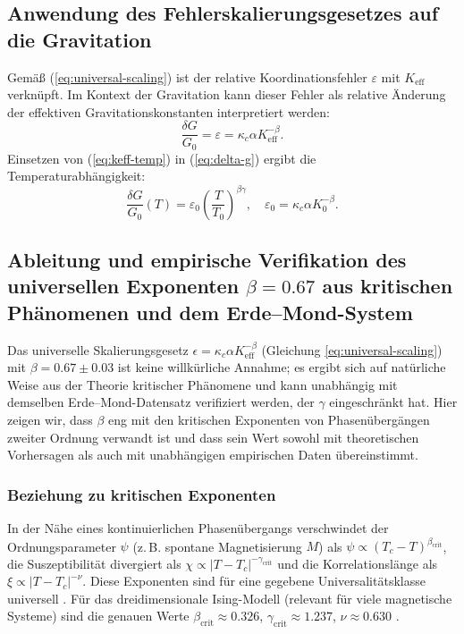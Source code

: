\documentclass[12pt]{article}
\theoremstyle{remark}
\newcommand{\Keff}{K_{\mathrm{eff}}}
\newcommand{\eps}{\varepsilon}
\newcommand{\kappac}{\kappa_c}
\begin{document}
	\subsection{Anwendung des Fehlerskalierungsgesetzes auf die Gravitation}
	\label{subsec:error-gravity}
	
	Gemäß (\ref{eq:universal-scaling}) ist der relative Koordinationsfehler $\eps$ mit $\Keff$ verknüpft. Im Kontext der Gravitation kann dieser Fehler als relative Änderung der effektiven Gravitationskonstanten interpretiert werden:
	\begin{equation}
		\frac{\delta G}{G_0} = \eps = \kappac \alpha \Keff^{-\beta}.
		\label{eq:delta-g}
	\end{equation}
	Einsetzen von (\ref{eq:keff-temp}) in (\ref{eq:delta-g}) ergibt die Temperaturabhängigkeit:
	\begin{equation}
		\frac{\delta G}{G_0}(T) = \eps_0 \left( \frac{T}{T_0} \right)^{\beta\gamma}, \quad \eps_0 = \kappac \alpha K_0^{-\beta}.
		\label{eq:g-temp}
	\end{equation}
	
	\subsection{Ableitung und empirische Verifikation des universellen Exponenten \(\beta = 0.67\) aus kritischen Phänomenen und dem Erde–Mond-System}
	\label{subsec:beta-empirical}
	
	Das universelle Skalierungsgesetz \(\epsilon = \kappa_c \alpha K_{\mathrm{eff}}^{-\beta}\) (Gleichung \ref{eq:universal-scaling}) mit \(\beta = 0.67 \pm 0.03\) ist keine willkürliche Annahme; es ergibt sich auf natürliche Weise aus der Theorie kritischer Phänomene und kann unabhängig mit demselben Erde–Mond-Datensatz verifiziert werden, der \(\gamma\) eingeschränkt hat. Hier zeigen wir, dass \(\beta\) eng mit den kritischen Exponenten von Phasenübergängen zweiter Ordnung verwandt ist und dass sein Wert sowohl mit theoretischen Vorhersagen als auch mit unabhängigen empirischen Daten übereinstimmt.
	
	\subsubsection{Beziehung zu kritischen Exponenten}
	In der Nähe eines kontinuierlichen Phasenübergangs verschwindet der Ordnungsparameter \(\psi\) (z. B. spontane Magnetisierung \(M\)) als \(\psi \propto (T_c - T)^{\beta_{\mathrm{crit}}}\), die Suszeptibilität divergiert als \(\chi \propto |T - T_c|^{-\gamma_{\mathrm{crit}}}\) und die Korrelationslänge als \(\xi \propto |T - T_c|^{-\nu}\). Diese Exponenten sind für eine gegebene Universalitätsklasse universell \cite{Wilson1974, Fisher1974}. Für das dreidimensionale Ising-Modell (relevant für viele magnetische Systeme) sind die genauen Werte \(\beta_{\mathrm{crit}} \approx 0.326\), \(\gamma_{\mathrm{crit}} \approx 1.237\), \(\nu \approx 0.630\) \cite{El-Showk2014}.
	
\end{document}
